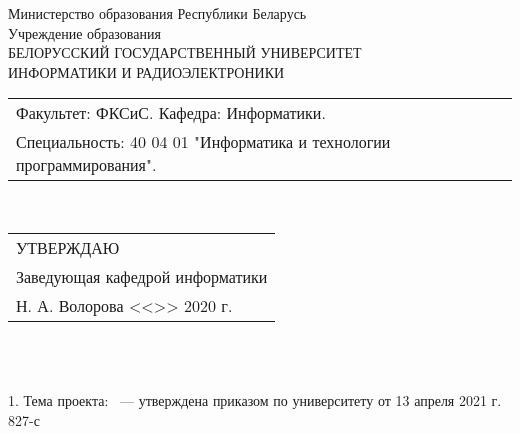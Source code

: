 {
  \thispagestyle{empty}
  \setlength{\parindent}{0em}

  \newcommand{\lineunderscore}{\uline{\hspace*{\fill}}}

  \begin{center}
    Министерство образования Республики Беларусь\\
    Учреждение образования\\
    БЕЛОРУССКИЙ ГОСУДАРСТВЕННЫЙ УНИВЕРСИТЕТ \\
    ИНФОРМАТИКИ И РАДИОЭЛЕКТРОНИКИ\\[1em]
  

  \begin{minipage}{\textwidth}
    \begin{flushleft}
      \begin{tabular}{ l }
        Факультет: ФКСиС. Кафедра: Информатики. \\
        Специальность: 40 04 01 "Информатика и технологии программирования".
      \end{tabular}
    \end{flushleft}
  \end{minipage}\\[1em]

  \begin{minipage}{\textwidth}
    \begin{flushright}
      \begin{tabular}{p{}}
        УТВЕРЖДАЮ \\
        Заведующая кафедрой информатики \\
        \underline{\hspace*{7em}} Н. А. Волорова
        <<\underline{\hspace*{4ex}}>> \underline{\hspace*{5em}} 2020 г.
      \end{tabular}
    \end{flushright}
  \end{minipage}\\[1em]

   \\

  {}

  \end{center}

  1. Тема проекта: ~--- утверждена приказом по университету от 13 апреля 2021 г.  \No{} 827-с

}
